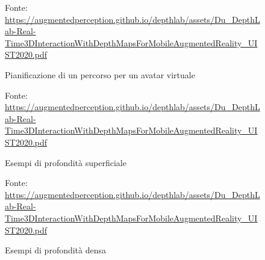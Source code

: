 \documentclass[crop=false, class=book]{standalone}
\begin{document}
		\begin{figure}
				\centering
				{Fonte: \url{https://augmentedperception.github.io/depthlab/assets/Du_DepthLab-Real-Time3DInteractionWithDepthMapsForMobileAugmentedReality_UIST2020.pdf}}
				\caption{Pianificazione di un percorso per un avatar virtuale}
				\label{fig: path-avatar}
		\end{figure}
		
		\begin{figure}
				\centering
				{Fonte: \url{https://augmentedperception.github.io/depthlab/assets/Du_DepthLab-Real-Time3DInteractionWithDepthMapsForMobileAugmentedReality_UIST2020.pdf}}
				\caption{Esempi di profondità superficiale}
				\label{fig: surfaces-depth}
		\end{figure}
		
		\begin{figure}
				\centering
				{Fonte: \url{https://augmentedperception.github.io/depthlab/assets/Du_DepthLab-Real-Time3DInteractionWithDepthMapsForMobileAugmentedReality_UIST2020.pdf}}
				\caption{Esempi di profondità densa}
				\label{fig: dense-depth}
		\end{figure}
\end{document}
